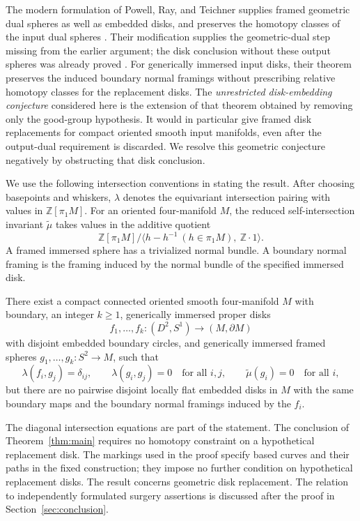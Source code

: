 The modern formulation of Powell, Ray, and Teichner supplies framed
geometric dual spheres as well as embedded disks, and preserves the
homotopy classes of the input dual spheres
\cite[Theorem~A]{PRT2025}. Their modification supplies the
geometric-dual step missing from the earlier argument; the disk
conclusion without these output spheres was already proved
\cite[Remark~1.3]{PRT2025}.
For generically immersed input disks, their theorem preserves the induced
boundary normal framings without prescribing relative homotopy classes
for the replacement disks.
The \emph{unrestricted disk-embedding conjecture} considered here is the
extension of that theorem obtained by removing only the good-group
hypothesis. It would in particular give framed disk replacements for
compact oriented smooth input manifolds, even after the output-dual
requirement is discarded. We resolve this geometric conjecture negatively
by obstructing that disk conclusion.

We use the following intersection conventions in stating the result.
After choosing basepoints and whiskers, \(\lambda\) denotes the
equivariant intersection pairing with values in \(\mathbb Z[\pi_1M]\).
For an oriented four-manifold \(M\), the reduced self-intersection invariant
\(\widetilde\mu\) takes values in the additive quotient
\[
 \mathbb Z[\pi_1M]\big/
 \big\langle h-h^{-1}\ (h\in\pi_1M),\ \mathbb Z\cdot1\big\rangle .
\]
A framed immersed sphere has a trivialized normal bundle. A boundary
normal framing is the framing induced by the normal bundle of the
specified immersed disk.

\begin{theorem}\label{thm:main}
There exist a compact connected oriented smooth four-manifold \(M\) with boundary,
an integer \(k\geq1\), generically immersed proper disks
\[
 f_1,\ldots,f_k:(D^2,S^1)\longrightarrow(M,\partial M)
\]
with disjoint embedded boundary circles, and generically immersed framed spheres
\(g_1,\ldots,g_k:S^2\longrightarrow M\), such that
\[
 \lambda(f_i,g_j)=\delta_{ij},\qquad
 \lambda(g_i,g_j)=0\quad\text{for all }i,j,\qquad
 \widetilde\mu(g_i)=0\quad\text{for all }i,
\]
but there are no pairwise disjoint locally flat embedded disks in \(M\)
with the same boundary maps and the boundary normal framings induced by the
\(f_i\).
\end{theorem}

The diagonal intersection equations are part of the statement.
The conclusion of Theorem~\ref{thm:main} requires no homotopy constraint on a
hypothetical replacement disk.
The markings used in the proof specify based curves and their paths in
the fixed construction; they impose no further condition on hypothetical
replacement disks. The result concerns geometric disk replacement.
The relation to independently formulated surgery assertions is discussed
after the proof in Section~\ref{sec:conclusion}.

